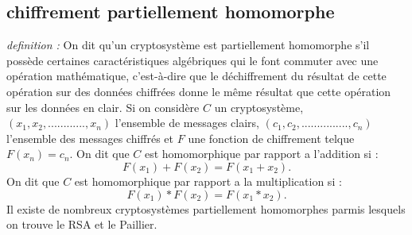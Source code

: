 \documentclass[a4paper,11pt]{report}
\begin{document}
\subsection{chiffrement partiellement homomorphe}
\textit{definition : } On dit qu'un cryptosystème est partiellement homomorphe  s'il possède certaines caractéristiques algébriques qui le font commuter avec une opération mathématique, c'est-à-dire que le déchiffrement du résultat de cette opération sur des données chiffrées donne le même résultat que cette opération sur les données en clair. \newline
Si on considère $C$ un cryptosystème, $(x_1, x_2, ............, x_n)$ l'ensemble de messages clairs, $(c_1, c_2, ..............., c_n)$ l'ensemble des messages chiffrés et $ F$ une fonction de chiffrement telque $F(x_n) = c_n$. \newline
On dit que $C$ est homomorphique par rapport a l'addition si : \newline
 $$F(x_1) + F(x_2) = F(x_1 + x_2).$$
 On dit que $C$ est homomorphique par rapport a la multiplication si : \newline
 $$F(x_1) * F(x_2) = F(x_1 * x_2).$$
Il existe de nombreux cryptosystèmes partiellement homomorphes parmis lesquels on trouve le RSA et le Paillier.%
\end{document}
